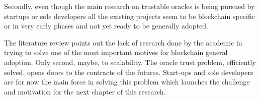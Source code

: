 Secondly, even though the main research on trustable oracles is being pursued by startups or sole developers all the existing projects seem to be blockchain specific or in very early phases and not yet ready to be generally adopted.


The literature review points out the lack of research done by the academic in trying to solve one of the most important motives for blockchain general adoption. Only second, maybe, to scalability. The oracle trust problem, efficiently solved, opens doors to the contracts of the futures. Start-ups and sole developers are for now the main force in solving this problem which launches the challenge and motivation for the next chapter of this research.